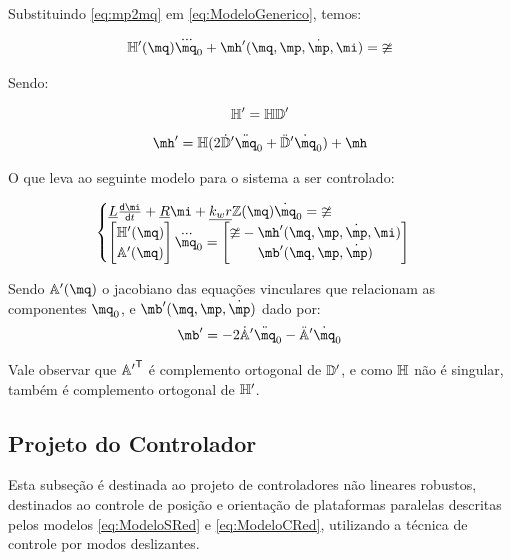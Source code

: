 \documentclass[a4paper,11pt,brazil,fleqn]{article}
\begin{document}
Substituindo \eqref{eq:mp2mq} em \eqref{eq:ModeloGenerico}, temos:

\begin{equation}
\mH'(\mq) \dddot{\mq}_0 + \mh'(\mq,\mp,\dot{\mp}, \mi) = \mup
\end{equation}

Sendo:

\begin{equation}
\mathbb{H}' = \mathbb{H} \mathbb{D}'
\end{equation}
\begin{equation}
\mh' = \mH( 2\dot{\mD}' \ddot{\mq}_0 + \ddot{\mD}' \dot{\mq}_0 ) + \mh
\end{equation}

O que leva ao seguinte modelo para o sistema a ser controlado:

\begin{equation} \label{eq:ModeloCRed}
\begin{cases}
\underline{L} \frac{\dd \mi}{\dd t} + \underline{R} \mi + \underline{k_w r} \mZ (\mq) \dot{\mq}_0= \mup
\\
\begin{bmatrix}
\mH'(\mq) \\
\mA'(\mq)
\end{bmatrix}
\dddot{\mq}_0
=
\begin{bmatrix}
\mup - \mh'(\mq,\mp,\dot{\mp}, \mi) \\
\mb'(\mq,\mp,\dot{\mp})
\end{bmatrix}
\end{cases}
\end{equation}

Sendo $\mA'(\mq)$ o jacobiano das equa\c{c}\~oes vinculares que relacionam as componentes $\mq_0$, e  $\mb'(\mq,\mp,\dot{\mp})$ dado por:
\begin{equation}
\mb' = -2 \dot{\mA}' \ddot{\mq}_0 - \ddot{\mA}' \dot{\mq}_0
\end{equation}

Vale observar que ${\mathbb{A}'}^{\mathsf{T}}$ \'e complemento ortogonal de $\mathbb{D}'$, e como $\mathbb{H}$ n\~ao \'e singular, tamb\'em \'e complemento ortogonal de $\mathbb{H}'$.

\subsection{Projeto do Controlador}\label{S04-6}

Esta subse\c{c}\~ao \'e destinada ao projeto de controladores n\~ao lineares robustos, destinados ao controle de posi\c{c}\~ao e orienta\c{c}\~ao de plataformas paralelas descritas pelos modelos \eqref{eq:ModeloSRed} e \eqref{eq:ModeloCRed}, utilizando a t\'ecnica de controle por modos deslizantes.
\end{document}
